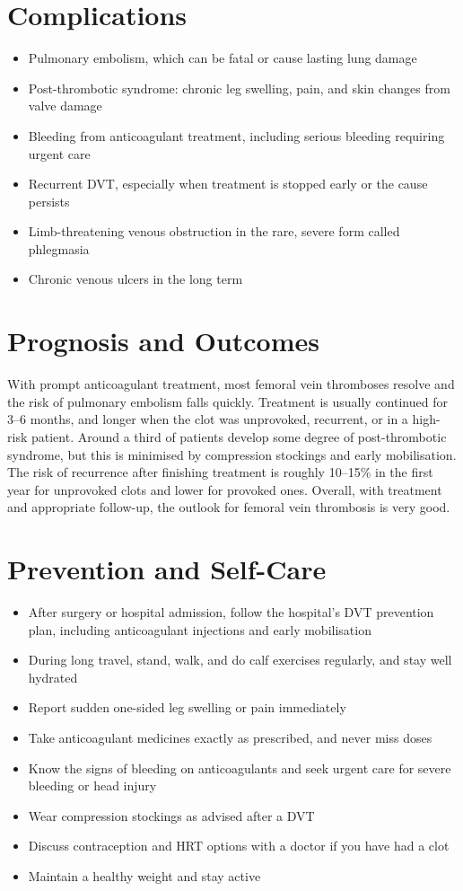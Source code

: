 \section*{Complications}
\begin{itemize}
    \item Pulmonary embolism, which can be fatal or cause lasting lung damage
    \item Post-thrombotic syndrome: chronic leg swelling, pain, and skin changes from valve damage
    \item Bleeding from anticoagulant treatment, including serious bleeding requiring urgent care
    \item Recurrent DVT, especially when treatment is stopped early or the cause persists
    \item Limb-threatening venous obstruction in the rare, severe form called phlegmasia
    \item Chronic venous ulcers in the long term
\end{itemize}

\section*{Prognosis and Outcomes}
With prompt anticoagulant treatment, most femoral vein thromboses resolve and the risk of pulmonary embolism falls quickly. Treatment is usually continued for 3--6 months, and longer when the clot was unprovoked, recurrent, or in a high-risk patient. Around a third of patients develop some degree of post-thrombotic syndrome, but this is minimised by compression stockings and early mobilisation. The risk of recurrence after finishing treatment is roughly 10--15\% in the first year for unprovoked clots and lower for provoked ones. Overall, with treatment and appropriate follow-up, the outlook for femoral vein thrombosis is very good.

\section*{Prevention and Self-Care}
\begin{itemize}
    \item After surgery or hospital admission, follow the hospital's DVT prevention plan, including anticoagulant injections and early mobilisation
    \item During long travel, stand, walk, and do calf exercises regularly, and stay well hydrated
    \item Report sudden one-sided leg swelling or pain immediately
    \item Take anticoagulant medicines exactly as prescribed, and never miss doses
    \item Know the signs of bleeding on anticoagulants and seek urgent care for severe bleeding or head injury
    \item Wear compression stockings as advised after a DVT
    \item Discuss contraception and HRT options with a doctor if you have had a clot
    \item Maintain a healthy weight and stay active
\end{itemize}

